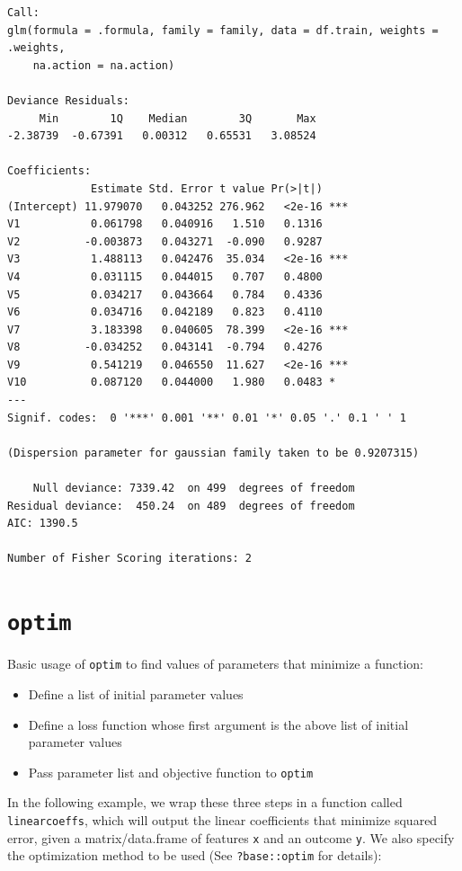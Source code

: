\documentclass[
]{book}
\providecommand{\tightlist}{%
  \setlength{\itemsep}{0pt}\setlength{\parskip}{0pt}}
\begin{document}
\begin{verbatim}
Call:
glm(formula = .formula, family = family, data = df.train, weights = .weights, 
    na.action = na.action)

Deviance Residuals: 
     Min        1Q    Median        3Q       Max  
-2.38739  -0.67391   0.00312   0.65531   3.08524  

Coefficients:
             Estimate Std. Error t value Pr(>|t|)    
(Intercept) 11.979070   0.043252 276.962   <2e-16 ***
V1           0.061798   0.040916   1.510   0.1316    
V2          -0.003873   0.043271  -0.090   0.9287    
V3           1.488113   0.042476  35.034   <2e-16 ***
V4           0.031115   0.044015   0.707   0.4800    
V5           0.034217   0.043664   0.784   0.4336    
V6           0.034716   0.042189   0.823   0.4110    
V7           3.183398   0.040605  78.399   <2e-16 ***
V8          -0.034252   0.043141  -0.794   0.4276    
V9           0.541219   0.046550  11.627   <2e-16 ***
V10          0.087120   0.044000   1.980   0.0483 *  
---
Signif. codes:  0 '***' 0.001 '**' 0.01 '*' 0.05 '.' 0.1 ' ' 1

(Dispersion parameter for gaussian family taken to be 0.9207315)

    Null deviance: 7339.42  on 499  degrees of freedom
Residual deviance:  450.24  on 489  degrees of freedom
AIC: 1390.5

Number of Fisher Scoring iterations: 2
\end{verbatim}

\hypertarget{optim-1}{%
\section{\texorpdfstring{\texttt{optim}}{optim}}\label{optim-1}}

Basic usage of \texttt{optim} to find values of parameters that minimize a function:

\begin{itemize}
\tightlist
\item
  Define a list of initial parameter values
\item
  Define a loss function whose first argument is the above list of initial parameter values
\item
  Pass parameter list and objective function to \texttt{optim}
\end{itemize}

In the following example, we wrap these three steps in a function called \texttt{linearcoeffs}, which will output the linear coefficients that minimize squared error, given a matrix/data.frame of features \texttt{x} and an outcome \texttt{y}. We also specify the optimization method to be used (See \texttt{?base::optim} for details):
\end{document}
